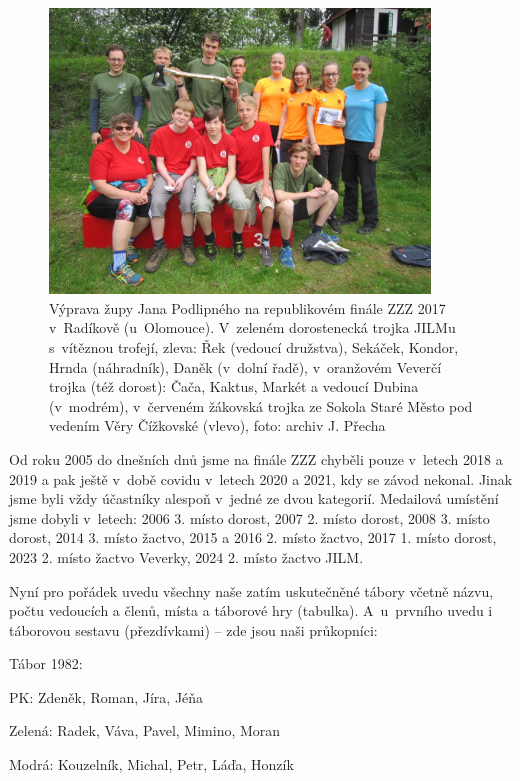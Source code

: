 \documentclass[a5paper, 11pt, twoside]{article}
\begin{document}
\begin{figure}[h]
  \centering 
  \includegraphics[width=0.9\textwidth]{img/81_zzz.JPG}
  \caption*{Výprava župy Jana Podlipného na republikovém finále ZZZ 2017
  v~Radíkově (u~Olomouce). V~zeleném dorostenecká trojka JILMu s~vítěznou
  trofejí, zleva: Řek (vedoucí družstva), Sekáček, Kondor, Hrnda
  (náhradník), Daněk (v~dolní řadě), v~oranžovém Veverčí trojka (též
  dorost): Čača, Kaktus, Markét a vedoucí Dubina (v~modrém), v~červeném
  žákovská trojka ze Sokola Staré Město pod vedením Věry Čížkovské
  (vlevo), foto: archiv J. Přecha}
\end{figure}

Od roku 2005 do dnešních dnů jsme na finále ZZZ chyběli pouze v~letech
2018 a 2019 a pak ještě v~době covidu v~letech 2020 a 2021, kdy se závod
nekonal. Jinak jsme byli vždy účastníky alespoň v~jedné ze dvou
kategorií. Medailová umístění jsme dobyli v~letech: 2006 3. místo
dorost, 2007 2. místo dorost, 2008 3. místo dorost, 2014 3. místo
žactvo, 2015 a 2016 2. místo žactvo, 2017 1. místo dorost, 2023 2. místo
žactvo Veverky, 2024 2. místo žactvo JILM.

Nyní pro pořádek uvedu všechny naše zatím uskutečněné tábory včetně
názvu, počtu vedoucích a členů, místa a táborové hry (tabulka).
A~u~prvního uvedu i táborovou sestavu (přezdívkami) -- zde jsou naši
průkopníci:

\vspace*{6pt}
Tábor 1982:

PK: Zdeněk, Roman, Jíra, Jéňa

Zelená: Radek, Váva, Pavel, Mimino, Moran

Modrá: Kouzelník, Michal, Petr, Láďa, Honzík
\end{document}

